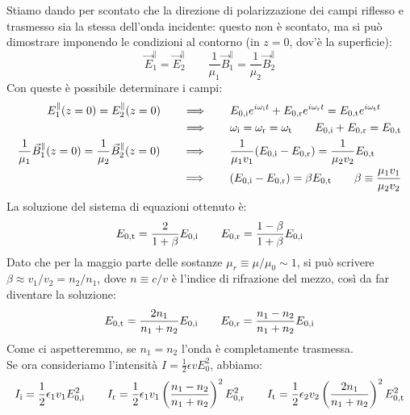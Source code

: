 Stiamo dando per scontato che la direzione di polarizzazione dei campi riflesso e trasmesso sia la stessa dell'onda incidente: questo non è scontato, ma si può dimostrare imponendo le condizioni al contorno (in $ z = 0 $, dov'è la superficie):
\begin{equation}
	\vec{E}_1^{\parallel} = \vec{E}_2^{\parallel} \qquad \frac{1}{\mu_1}\vec{B}_1^{\parallel} = \frac{1}{\mu_2}\vec{B}_2^{\parallel}
	\label{eq:53}
\end{equation}
Con queste è possibile determinare i campi:
\begin{align}
	\begin{split}
		E_1^{\parallel}(z=0) = E_2^{\parallel}(z=0) &\qquad\Longrightarrow\qquad E_{0,\text{i}} e^{i\omega_{\text{i}} t} + E_{0,\text{r}} e^{i\omega_{\text{r}} t} = E_{0,\text{t}} e^{i\omega_{\text{t}} t} \\ 
							    &\qquad\Longrightarrow\qquad \omega_{\text{i}} = \omega_{\text{r}} = \omega_{\text{t}} \qquad E_{0,\text{i}} + E_{0,\text{r}} = E_{0,\text{t}}
	\end{split}
	\\ 
	\begin{split}
		\frac{1}{\mu_1}\vec{B}_1^{\parallel}(z=0) = \frac{1}{\mu_2}\vec{B}_2^{\parallel}(z=0) &\qquad\Longrightarrow\qquad \frac{1}{\mu_1 v_1} (E_{0,\text{i}} - E_{0,\text{r}}) = \frac{1}{\mu_2 v_2} E_{0,\text{t}} \\ 
												      &\qquad\Longrightarrow\qquad (E_{0,\text{i}} - E_{0, \text{r}}) = \beta E_{0,\text{t}} \qquad \beta \equiv \frac{\mu_1 v_1}{\mu_2 v_2}
	\end{split}
	\label{eq:54-55}
\end{align}
La soluzione del sistema di equazioni ottenuto è:
\begin{equation}
	E_{0,\text{t}} = \frac{2}{1 + \beta} E_{0,\text{i}} \qquad E_{0,\text{r}} = \frac{1 - \beta}{1 + \beta} E_{0,\text{i}}
	\label{eq:56}
\end{equation}
Dato che per la maggio parte delle sostanze $ \mu_r \equiv \mu / \mu_0 \sim 1 $, si può scrivere $ \beta \approx v_1 / v_2 = n_2 / n_1 $, dove $ n \equiv c / v $ è l'indice di rifrazione del mezzo, così da far diventare la soluzione:
\begin{equation}
	E_{0,\text{t}} = \frac{2n_1}{n_1 + n_2} E_{0,\text{i}} \qquad E_{0,\text{r}} = \frac{n_1 - n_2}{n_1 + n_2} E_{0,\text{i}}
	\label{eq:57}
\end{equation}
Come ci aspetteremmo, se $ n_1 = n_2 $ l'onda è completamente trasmessa. \\ 
%
Se ora consideriamo l'intensità $ I = \frac{1}{2} \epsilon v E_0^2 $, abbiamo:
\begin{equation}
	I_{\text{i}} = \frac{1}{2} \epsilon_1 v_1 E_{0,\text{i}}^2 \qquad I_{\text{r}} = \frac{1}{2} \epsilon_1 v_1 \left( \frac{n_1 - n_2}{n_1 + n_2}\right)^2 E_{0,\text{r}}^2 \qquad I_{\text{t}} = \frac{1}{2} \epsilon_2 v_2 \left( \frac{2n_1}{n_1 + n_2} \right)^2 E_{0,\text{t}}^2
	\label{eq:58}
\end{equation}
